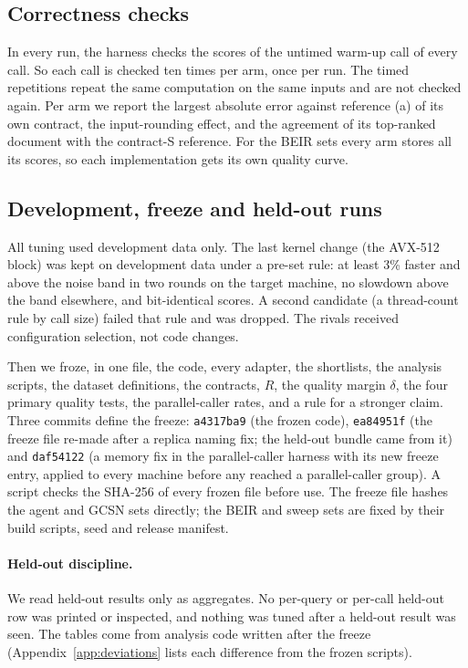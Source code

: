\subsection{Correctness checks}

In every run, the harness checks the scores of the untimed warm-up call of every call.
So each call is checked ten times per arm, once per run.
The timed repetitions repeat the same computation on the same inputs and are not checked again.
Per arm we report the largest absolute error against reference (a) of its own contract, the input-rounding effect, and the agreement of its top-ranked document with the contract-S reference.
For the BEIR sets every arm stores all its scores, so each implementation gets its own quality curve.

\subsection{Development, freeze and held-out runs}
\label{sec:freeze}

All tuning used development data only.
The last kernel change (the AVX-512 block) was kept on development data under a pre-set rule: at least 3\% faster and above the noise band in two rounds on the target machine, no slowdown above the band elsewhere, and bit-identical scores.
A second candidate (a thread-count rule by call size) failed that rule and was dropped.
The rivals received configuration selection, not code changes.

Then we froze, in one file, the code, every adapter, the shortlists, the analysis scripts, the dataset definitions, the contracts, $R$, the quality margin $\delta$, the four primary quality tests, the parallel-caller rates, and a rule for a stronger claim.
Three commits define the freeze: \texttt{a4317ba9} (the frozen code), \texttt{ea84951f} (the freeze file re-made after a replica naming fix; the held-out bundle came from it) and \texttt{daf54122} (a memory fix in the parallel-caller harness with its new freeze entry, applied to every machine before any reached a parallel-caller group).
A script checks the SHA-256 of every frozen file before use.
The freeze file hashes the agent and GCSN sets directly; the BEIR and sweep sets are fixed by their build scripts, seed and release manifest.

\paragraph{Held-out discipline.}
We read held-out results only as aggregates.
No per-query or per-call held-out row was printed or inspected, and nothing was tuned after a held-out result was seen.
The tables come from analysis code written after the freeze (Appendix~\ref{app:deviations} lists each difference from the frozen scripts).
